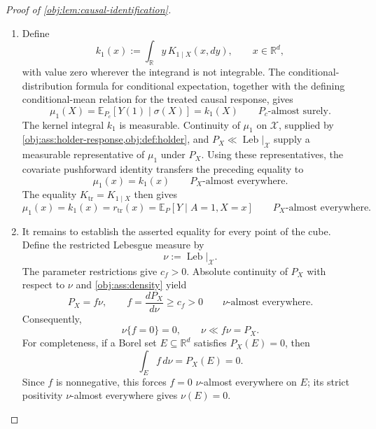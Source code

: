 \begin{proof}[Proof of \cref{obj:lem:causal-identification}]
\begin{enumerate}
The choices \(\lambda=1\) and \(\lambda=-1\) control the absolute first moment. Indeed, for every \(y\in\mathbb R\),
\[
1+|y-r_{\mathrm{tr}}(x)|
\le e^{|y-r_{\mathrm{tr}}(x)|}
\le e^{y-r_{\mathrm{tr}}(x)}
   +e^{-(y-r_{\mathrm{tr}}(x))},
\]
so
\[
|y|
\le |y-r_{\mathrm{tr}}(x)|+|r_{\mathrm{tr}}(x)|
\le e^{y-r_{\mathrm{tr}}(x)}
   +e^{-(y-r_{\mathrm{tr}}(x))}
   +|r_{\mathrm{tr}}(x)|.
\]
The right-hand side is integrable under \(K_{1\mid X}(x)\). Integrating the inequality and using the exponential bounds yields
\[
\begin{aligned}
\int_{\mathbb R}|y|\,K_{1\mid X}(x,dy)
&\le
\int_{\mathbb R}e^{y-r_{\mathrm{tr}}(x)}\,K_{1\mid X}(x,dy)
+\int_{\mathbb R}e^{-(y-r_{\mathrm{tr}}(x))}\,K_{1\mid X}(x,dy)
+|r_{\mathrm{tr}}(x)|\\
&\le 2e^{B^2/2}+B.
\end{aligned}
\]
This bound is uniform on a set of full \(P_X\)-measure. Disintegration therefore gives
\[
\int |Y(1)|\,dP_c
=
\int_{\mathbb R^d}
\left(\int_{\mathbb R}|y|\,K_{1\mid X}(x,dy)\right)P_X(dx)
\le 2e^{B^2/2}+B<\infty.
\]
In particular, \(Y(1)\) is integrable under \(P_c\).

\item Define
\[
k_1(x):=\int_{\mathbb R}y\,K_{1\mid X}(x,dy),
\qquad x\in\mathbb R^d,
\]
with value zero wherever the integrand is not integrable. The conditional-distribution formula for conditional expectation, together with the defining conditional-mean relation for the treated causal response, gives
\[
\mu_1(X)
=\mathbb E_{P_c}[Y(1)\mid\sigma(X)]
=k_1(X)
\qquad P_c\text{-almost surely}.
\]
The kernel integral \(k_1\) is measurable. Continuity of \(\mu_1\) on \(\mathcal X\), supplied by
\cref{obj:ass:holder-response,obj:def:holder}, and
\(P_X\ll\operatorname{Leb}|_{\mathcal X}\) supply a measurable representative of \(\mu_1\) under \(P_X\). Using these representatives, the covariate pushforward identity transfers the preceding equality to
\[
\mu_1(x)=k_1(x)
\qquad P_X\text{-almost everywhere}.
\]
The equality \(K_{\mathrm{tr}}=K_{1\mid X}\) then gives
\[
\mu_1(x)
=k_1(x)
=r_{\mathrm{tr}}(x)
=\mathbb E_P[Y\mid A=1,X=x]
\qquad P_X\text{-almost everywhere}.
\]

\item It remains to establish the asserted equality for every point of the cube. Define the restricted Lebesgue measure by
\[
\nu:=\operatorname{Leb}|_{\mathcal X}.
\]
The parameter restrictions give \(c_f>0\). Absolute continuity of \(P_X\) with respect to \(\nu\) and \cref{obj:ass:density} yield
\[
P_X=f\nu,
\qquad
f=\frac{dP_X}{d\nu}\ge c_f>0
\qquad \nu\text{-almost everywhere}.
\]
Consequently,
\[
\nu\{f=0\}=0,
\qquad
\nu\ll f\nu=P_X.
\]
For completeness, if a Borel set \(E\subseteq\mathbb R^d\) satisfies \(P_X(E)=0\), then
\[
\int_E f\,d\nu=P_X(E)=0.
\]
Since \(f\) is nonnegative, this forces \(f=0\) \(\nu\)-almost everywhere on \(E\); its strict positivity \(\nu\)-almost everywhere gives \(\nu(E)=0\).


\end{enumerate}
\end{proof}
